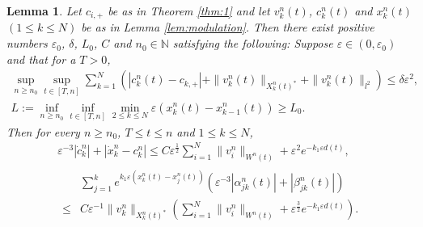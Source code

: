 \documentclass[11pt]{amsart}
\newtheorem{lemma}[theorem]{Lemma}
\theoremstyle{remark}
\numberwithin{equation}{section}
\begin{document}
\begin{lemma}
  \label{lem:parametersupb}
Let $c_{i,+}$ be as in Theorem \ref{thm:1} and let $v_k^n(t)$, $c_k^n(t)$
and $x_k^n(t)$ $(1\le k\le N)$ be as in Lemma \ref{lem:modulation}.
Then there exist positive numbers ${\varepsilon}_0$, $\delta$, $L_0$, $C$ and $n_0\in{\mathbb{N}}$
satisfying the following: Suppose ${\varepsilon}\in(0,{\varepsilon}_0)$ and that for a $T>0$,
\begin{gather*} \sup_{n\ge n_0}\sup_{t\in[T,n]}\sum_{k=1}^N
\left(|c_k^n(t)-c_{k,+}|+\|v_k^n(t)\|_{X_k^n(t)^*}+\|v_k^n(t)\|_{l^2}\right)
\le \delta{\varepsilon}^2,
\\ L:=\inf_{n\ge n_0}\inf_{t\in[T,n]}\min_{2\le k\le N}
{\varepsilon}(x_k^n(t)-x_{k-1}^n(t))\ge L_0.
 \end{gather*}
Then for every $n\ge n_0$, $T\le t\le n$ and $1\le k\le N$,
\begin{gather}
\label{eq:xcupb}
{\varepsilon}^{-3}|\dot{c}_k^n|+|\dot{x}_k^n-c_k^n|
\le C {\varepsilon}^{\frac12}\sum_{i=1}^N\|v_i^n\|_{W^n(t)}+{\varepsilon}^2e^{-k_1{\varepsilon} d(t)},
\\ \label{eq:alphabetaupb}
\begin{split}
& \sum_{j=1}^k e^{k_1{\varepsilon}(x_k^n(t)-x_j^n(t))}
({\varepsilon}^{-3}|\alpha_{jk}^n(t)|+|\beta_{jk}^n(t)|) \\  \le & C 
{\varepsilon}^{-1}\|v_k^n\|_{X_k^n(t)^*}
\left(\sum_{i=1}^N\|v_i^n\|_{W^n(t)}+{\varepsilon}^{\frac32}e^{-k_1{\varepsilon} d(t)}\right).
\end{split}
\end{gather}
\end{lemma}
\end{document}
